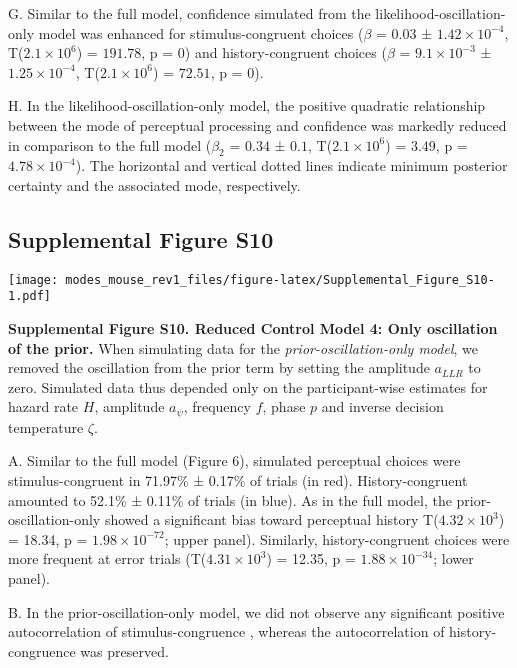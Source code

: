 \documentclass[
]{article}
\begin{document}
G. Similar to the full model, confidence simulated from the
likelihood-oscillation-only model was enhanced for stimulus-congruent
choices (\(\beta\) = \(0.03\) ± \(\ensuremath{1.42\times 10^{-4}}\),
T(\(\ensuremath{2.1\times 10^{6}}\)) = \(191.78\), p = \(0\)) and
history-congruent choices (\(\beta\) =
\(\ensuremath{9.1\times 10^{-3}}\) ±
\(\ensuremath{1.25\times 10^{-4}}\),
T(\(\ensuremath{2.1\times 10^{6}}\)) = \(72.51\), p = \(0\)).

H. In the likelihood-oscillation-only model, the positive quadratic
relationship between the mode of perceptual processing and confidence
was markedly reduced in comparison to the full model (\(\beta_2\) =
\(0.34\) ± \(0.1\), T(\(\ensuremath{2.1\times 10^{6}}\)) = \(3.49\), p =
\(\ensuremath{4.78\times 10^{-4}}\)). The horizontal and vertical dotted
lines indicate minimum posterior certainty and the associated mode,
respectively.

\newpage

\hypertarget{supplemental-figure-s10}{%
\subsection{Supplemental Figure S10}\label{supplemental-figure-s10}}

\texttt{[image: modes\_mouse\_rev1\_files/figure-latex/Supplemental\_Figure\_S10-1.pdf]}

\textbf{Supplemental Figure S10. Reduced Control Model 4: Only
oscillation of the prior.} When simulating data for the
\emph{prior-oscillation-only model}, we removed the oscillation from the
prior term by setting the amplitude \(a_{LLR}\) to zero. Simulated data
thus depended only on the participant-wise estimates for hazard rate
\(H\), amplitude \(a_{\psi}\), frequency \(f\), phase \(p\) and inverse
decision temperature \(\zeta\).

A. Similar to the full model (Figure 6), simulated perceptual choices
were stimulus-congruent in 71.97\% ± 0.17\% of trials (in red).
History-congruent amounted to 52.1\% ± 0.11\% of trials (in blue). As in
the full model, the prior-oscillation-only showed a significant bias
toward perceptual history T(\ensuremath{4.32\times 10^{3}}) = 18.34, p =
\(\ensuremath{1.98\times 10^{-72}}\); upper panel). Similarly,
history-congruent choices were more frequent at error trials
(T(\ensuremath{4.31\times 10^{3}}) = 12.35, p =
\(\ensuremath{1.88\times 10^{-34}}\); lower panel).

B. In the prior-oscillation-only model, we did not observe any
significant positive autocorrelation of stimulus-congruence , whereas
the autocorrelation of history-congruence was preserved.
\end{document}
